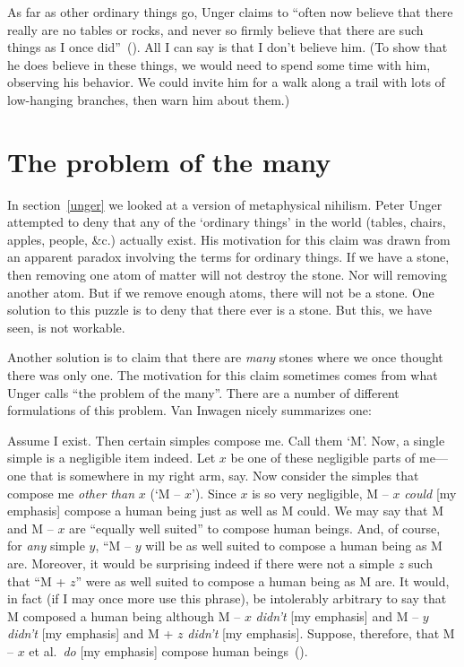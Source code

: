 \documentclass[11pt]{article}
\newenvironment{squote}{%
	\begin{spacing}{1}
	\begin{list}{}{%
	\setlength{\labelwidth}{0pt}%
	\rightmargin\leftmargin%
	}
	\item\relax
	}{%
	\end{list}%
	\end{spacing}
	}
\begin{document}
\begin{spacing}{1.5}
As far as other ordinary things go, Unger claims to ``often now believe that there really are no tables or rocks, and never so firmly believe that there are such things as I once did''~(\citeyear[543]{unger1980b}). All I can say is that I don't believe him. (To show that he does believe in these things, we would need to spend some time with him, observing his behavior. We could invite him for a walk along a trail with lots of low-hanging branches, then warn him about them.)

\section{The problem of the many}
\label{many}
In section~\ref{unger} we looked at a version of metaphysical nihilism. Peter Unger attempted to deny that any of the `ordinary things' in the world (tables, chairs, apples, people, \&c.) actually exist. His motivation for this claim was drawn from an apparent paradox involving the terms for ordinary things. If we have a stone, then removing one atom of matter will not destroy the stone. Nor will removing another atom. But if we remove enough atoms, there will not be a stone. One solution to this puzzle is to deny that there ever is a stone. But this, we have seen, is not workable.

Another solution is to claim that there are {\em many} stones where we once thought there was only one. The motivation for this claim sometimes comes from what Unger calls ``the problem of the many''. There are a number of different formulations of this problem. Van Inwagen nicely summarizes one:
\begin{squote}
Assume I exist. Then certain simples compose me. Call them `M'. Now, a single simple is a negligible item indeed. Let $x$ be one of these negligible parts of me---one that is somewhere in my right arm, say. Now consider the simples that compose me {\em other than} $x$ (`M -- $x$'). Since $x$ is so very negligible, M -- $x$ {\em could} [my emphasis] compose a human being just as well as M could. We may say that M and M -- $x$ are ``equally well suited'' to compose human beings. And, of course, for {\em any} simple $y$, ``M -- $y$ will be as well suited to compose a human being as M are. Moreover, it would be surprising indeed if there were not a simple $z$ such that ``M + $z$'' were as well suited to compose a human being as M are. It would, in fact (if I may once more use this phrase), be intolerably arbitrary to say that M composed a human being although M -- $x$ {\em didn't} [my emphasis] and M -- $y$ {\em didn't} [my emphasis] and M + $z$ {\em didn't} [my emphasis]. Suppose, therefore, that M -- $x$ et al.\ {\em do} [my emphasis] compose human beings~(\citeyear[215]{inwagen1995}).
\end{squote}


\end{spacing}
\end{document}
